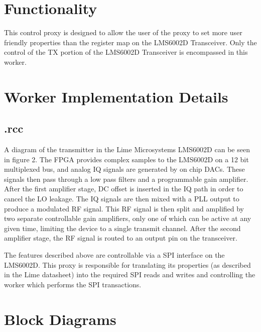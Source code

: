 \def\name{\comp}
\def\workertype{Proxy}
\def\version{\ocpiversion}
\def\releasedate{4/2019}
\def\componentlibrary{ocpi.assets.devices}
\def\workers{\comp{}.rcc}
\def\testedplatforms{CentOS 6/7 (via ml605/Zipper for HPC and LPC FMC slots), CentOS 7 (via alst4/Zipper), xilinx13\_{}3}


\section*{Functionality}
This control proxy is designed to allow the user of the proxy to set more user friendly properties than the register map on the LMS6002D Transceiver.  Only the control of the TX portion of the LMS6002D Transceiver is encompassed in this worker.

\section*{Worker Implementation Details}
\subsection*{\comp.rcc}
A diagram of the transmitter in the Lime Microsystems LMS6002D can be seen in figure 2. The FPGA provides complex samples to the LMS6002D on a 12 bit multiplexed bus, and analog IQ signals are generated by on chip DACs. These signals then pass through a low pass filters and a programmable gain amplifier. After the first amplifier stage, DC offset is inserted in the IQ path in order to cancel the LO leakage. The IQ signals are then mixed with a PLL output to produce a modulated RF signal. This RF signal is then split and amplified by two separate controllable gain amplifiers, only one of which can be active at any given time, limiting the device to a single transmit channel. After the second amplifier stage, the RF signal is routed to an output pin on the transceiver.\par\bigskip
\noindent The features described above are controllable via a SPI interface on the LMS6002D. This proxy is responsible for translating its properties (as described in the Lime datasheet) into the required SPI reads and writes and controlling the worker which performs the SPI transactions.
\newpage

\section*{Block Diagrams}
